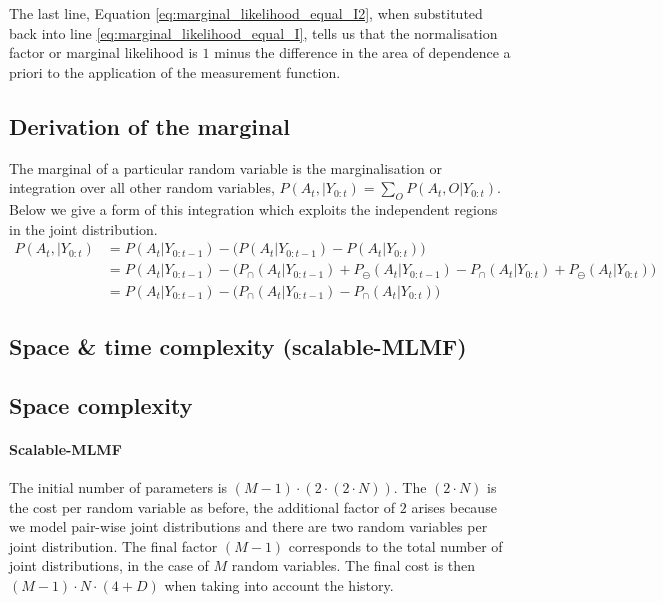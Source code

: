 The last line, Equation \ref{eq:marginal_likelihood_equal_I2}, when substituted back into line \ref{eq:marginal_likelihood_equal_I}, tells us that the normalisation factor or marginal likelihood is $1$ minus the difference in the area of
dependence a priori to the application of the measurement function.

\subsection{Derivation of the marginal}\label{appendix:marginal}

The marginal of a particular random variable is the marginalisation or integration over all other random variables, $P(A_t,|Y_{0:t}) = \sum\limits_{O} P(A_t,O|Y_{0:t})$. Below 
we give a form of this integration which exploits the independent regions in the joint distribution.
\begin{align}
 P(A_t,|Y_{0:t}) &= P(A_t|Y_{0:t-1}) - \Big(P(A_t|Y_{0:t-1}) - P(A_t|Y_{0:t}) \Big)  \\ 
		  &=  P(A_t|Y_{0:t-1}) - \Big(P_{\cap}(A_t|Y_{0:t-1}) + P_{\ominus}(A_t|Y_{0:t-1}) -  P_{\cap}(A_t|Y_{0:t}) + P_{\ominus}(A_t|Y_{0:t})   \Big) \label{eq:dependence1} \\
		  &=  P(A_t|Y_{0:t-1}) - \Big(P_{\cap}(A_t|Y_{0:t-1}) -  P_{\cap}(A_t|Y_{0:t})  \Big) \label{eq:dependence2} 
\end{align}


\subsection{Space \& time complexity (scalable-MLMF)}\label{appendix:space_time_scalable_mlmf}


\subsection{Space complexity}

\paragraph{Scalable-MLMF}
The initial number of parameters is $\left(M - 1\right) \cdot \left(2 \cdot (2 \cdot N)\right)$. The $(2 \cdot N)$ is the cost per random variable
as before, the additional factor of $2$ arises because we model pair-wise joint distributions and there are two random variables per joint distribution. The final
factor $\left(M - 1\right)$ corresponds to the total number of joint distributions, in the case of $M$ random variables. The final cost is then 
$(M - 1) \cdot N \cdot \left(4 + D\right)$ when taking into account the history.

